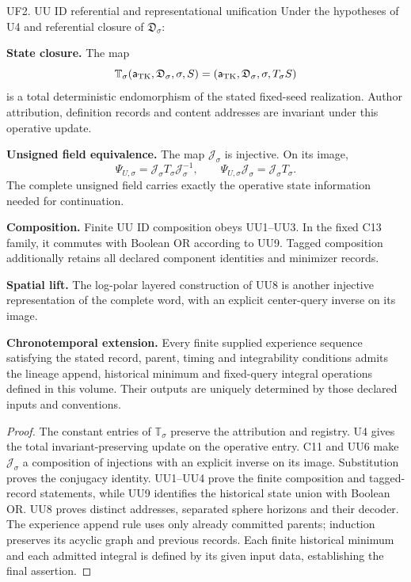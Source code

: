 \documentclass[11pt,a4paper]{article}
\numberwithin{equation}{section}
\begin{document}
\begin{formal}{UF2. UU ID referential and representational unification}
Under the hypotheses of U4 and referential closure of $\mathfrak D_\sigma$:

\textbf{State closure.} The map
\[
\mathbb T_\sigma(\mathsf a_{\rm TK},\mathfrak D_\sigma,\sigma,S)
=(\mathsf a_{\rm TK},\mathfrak D_\sigma,\sigma,T_\sigma S)
\]
is a total deterministic endomorphism of the stated fixed-seed realization. Author attribution, definition records and content addresses are invariant under this operative update.

\textbf{Unsigned field equivalence.} The map $\mathcal J_\sigma$ is injective. On its image,
\[
\Psi_{U,\sigma}=\mathcal J_\sigma T_\sigma\mathcal J_\sigma^{-1},
\qquad\Psi_{U,\sigma}\mathcal J_\sigma=\mathcal J_\sigma T_\sigma.
\]
The complete unsigned field carries exactly the operative state information needed for continuation.

\textbf{Composition.} Finite UU ID composition obeys UU1--UU3. In the fixed C13 family, it commutes with Boolean OR according to UU9. Tagged composition additionally retains all declared component identities and minimizer records.

\textbf{Spatial lift.} The log-polar layered construction of UU8 is another injective representation of the complete word, with an explicit center-query inverse on its image.

\textbf{Chronotemporal extension.} Every finite supplied experience sequence satisfying the stated record, parent, timing and integrability conditions admits the lineage append, historical minimum and fixed-query integral operations defined in this volume. Their outputs are uniquely determined by those declared inputs and conventions.
\end{formal}
\begin{proof}
The constant entries of $\mathbb T_\sigma$ preserve the attribution and registry. U4 gives the total invariant-preserving update on the operative entry. C11 and UU6 make $\mathcal J_\sigma$ a composition of injections with an explicit inverse on its image. Substitution proves the conjugacy identity. UU1--UU4 prove the finite composition and tagged-record statements, while UU9 identifies the historical state union with Boolean OR. UU8 proves distinct addresses, separated sphere horizons and their decoder. The experience append rule uses only already committed parents; induction preserves its acyclic graph and previous records. Each finite historical minimum and each admitted integral is defined by its given input data, establishing the final assertion.
\end{proof}
\end{document}
